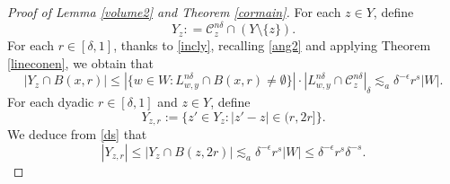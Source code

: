 \documentclass[11pt,a4paper,reqno]{amsart}
\newcommand{\calC}{\mathcal{C}}
\newcommand{\1}{\mathbf{1}}
\numberwithin{equation}{section}
\theoremstyle{plain}
\theoremstyle{definition}
\theoremstyle{remark}
\begin{document}
\begin{proof}[Proof of Lemma \ref{volume2} and Theorem \ref{cormain}]
For each $z \in Y$, define
$$  Y_z : = \calC_z^{n\delta} \cap (Y\setminus \{z\}).  $$
For each $r \in [\delta,1]$, thanks to \eqref{incly}, recalling \eqref{ang2} and applying Theorem \ref{lineconen}, we obtain that
\begin{equation}\label{ds}
    |Y_z \cap B(x,r)|  \le  |\{w \in W: L_{w,y}^{n\delta} \cap B(x,r) \ne \emptyset\}| \cdot |L_{w,y}^{n\delta} \cap \calC_z^{n\delta}|_\delta \lesssim_a \delta^{-\epsilon}r^s|W|.
\end{equation}
   For each dyadic $r \in [\delta,1]$ and $z \in Y$, define
   $$  Y_{z,r}:= \{ z' \in Y_z : |z'-z|  \in (r,2r]  \} . $$
   We deduce from \eqref{ds} that
   \begin{equation}\label{yzr}
     |Y_{z,r}| \le |Y_z \cap B(z,2r)| \lesssim_a \delta^{-\epsilon}r^s|W| \le \delta^{-\epsilon}r^s\delta^{-s} .
   \end{equation}



\end{proof}
\end{document}
